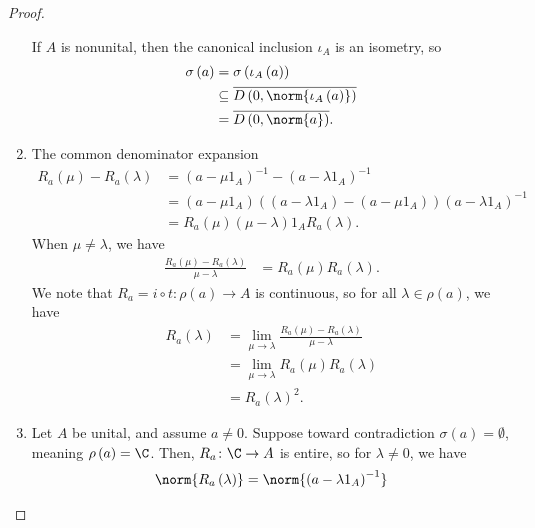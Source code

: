 \documentclass[10pt]{mypackage}
\begin{document}
\begin{proof}
\begin{enumerate}[(1)]
      If $A$ is nonunital, then the canonical inclusion $\iota_A$ is an isometry, so
      \begin{align*}
        \sigma\left(a\right) &= \sigma\left(\iota_A\left(a\right)\right)\\
                             &\subseteq \overline{D\left(0,\norm{\iota_A\left(a\right)}\right)}\\
                             &= \overline{D\left(0,\norm{a}\right)}.
      \end{align*}
    \item The common denominator expansion
      \begin{align*}
        R_a\left(\mu\right) - R_a\left(\lambda\right) &= \left(a-\mu 1_A\right)^{-1}- \left(a-\lambda 1_A  \right)^{-1}\\
                                                      &= \left(a-\mu 1_A\right)\left(\left(a-\lambda 1_A\right)-\left(a-\mu 1_A\right)\right)\left(a-\lambda 1_A\right)^{-1}\\
                                                      &= R_a\left(\mu\right)\left(\mu - \lambda\right)1_A R_a\left(\lambda\right).
      \end{align*}
      When $\mu \neq \lambda$, we have
      \begin{align*}
        \frac{R_a\left(\mu\right) - R_a\left(\lambda\right)}{\mu-\lambda} &= R_a\left(\mu\right)R_a\left(\lambda\right).
      \end{align*}
      We note that $R_a = i\circ t\colon \rho\left(a\right)\rightarrow A$ is continuous, so for all $\lambda\in \rho\left(a\right)$, we have
      \begin{align*}
        R_a\left(\lambda\right) &= \lim_{\mu\rightarrow\lambda}\frac{R_a\left(\mu\right) - R_a\left(\lambda\right)}{\mu-\lambda}\\
                                &= \lim_{\mu\rightarrow\lambda}R_a\left(\mu\right)R_a\left(\lambda\right)\\
                                &= R_a\left(\lambda\right)^2.
      \end{align*}
    \item Let $A$ be unital, and assume $a\neq 0$. Suppose toward contradiction $\sigma\left(a\right) = \emptyset$, meaning $\rho\left(a\right) = \C$. Then, $R_a\colon \C\rightarrow A$ is entire, so for $\lambda\neq 0$, we have
      \begin{align*}
        \norm{R_a\left(\lambda\right)} &= \norm{\left(a-\lambda 1_A\right)^{-1}}\\

\end{align*}
\end{enumerate}
\end{proof}
\end{document}
